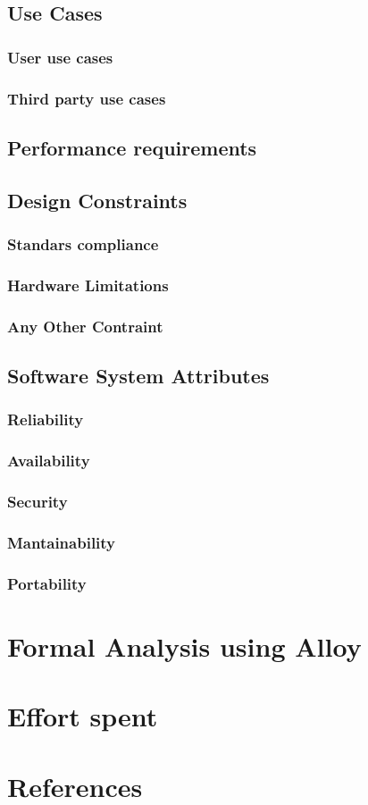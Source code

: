 \documentclass{article}
\begin{document}
\subsection{Use Cases}
\subsubsection{User use cases}
\subsubsection{Third party use cases}
\subsection{Performance requirements}
\subsection{Design Constraints}
\subsubsection{Standars compliance}
\subsubsection{Hardware Limitations}
\subsubsection{Any Other Contraint}
\subsection{Software System Attributes}
\subsubsection{Reliability}
\subsubsection{Availability}
\subsubsection{Security}
\subsubsection{Mantainability}
\subsubsection{Portability}
\section{Formal Analysis using Alloy}
\section{Effort spent}
\section{References}


    
\end{document}
